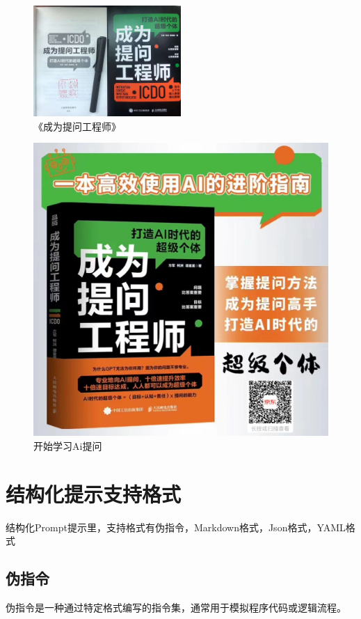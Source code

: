 \documentclass[12pt]{book}
\begin{document}
	\begin{figure}[htbp]
		\centering
		\includegraphics[width=0.5\textwidth]{image/prompt.jpg}
		\caption{《成为提问工程师》}
		\label{fig:myImage3}
	\end{figure}
		\begin{figure}[htbp]
		\centering
		\includegraphics[width=1.0\textwidth]{image/pe.png}
		\caption{开始学习Ai提问}
		\label{fig:myImage2}
	\end{figure}
	
\chapter{结构化提示支持格式}

结构化Prompt提示里，支持格式有伪指令，Markdown格式，Json格式，YAML格式

\section{伪指令}
伪指令是一种通过特定格式编写的指令集，通常用于模拟程序代码或逻辑流程。
\end{document}
